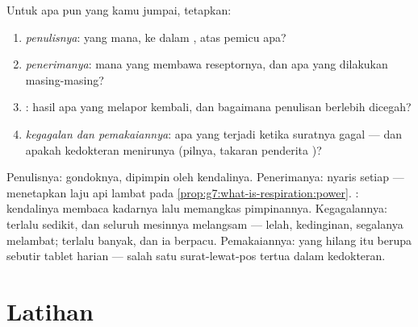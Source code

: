 \begin{method}\label{met:g8:hormonal-communication:read}
Untuk  apa pun yang kamu jumpai, tetapkan:
\begin{enumerate}
  \item \emph{penulisnya}:  yang mana, ke dalam
        , atas pemicu apa?
  \item \emph{penerimanya}:  mana yang membawa
        reseptornya, dan apa yang dilakukan masing-masing?
  \item \emph{}: hasil apa yang melapor
        kembali, dan bagaimana penulisan berlebih dicegah?
  \item \emph{kegagalan dan pemakaiannya}: apa yang terjadi
        ketika suratnya gagal --- dan apakah kedokteran
        menirunya (pilnya, takaran penderita )?
\end{enumerate}
\end{method}

\begin{example}\label{ex:g8:hormonal-communication:thyroid}
Penulisnya:  gondoknya, dipimpin oleh 
kendalinya. Penerimanya: nyaris setiap  --- 
menetapkan laju api lambat pada
\cref{prop:g7:what-is-respiration:power}. :
 kendalinya membaca kadarnya lalu memangkas
pimpinannya. Kegagalannya: terlalu sedikit, dan seluruh
mesinnya melangsam --- lelah, kedinginan, segalanya
melambat; terlalu banyak, dan ia berpacu. Pemakaiannya:
 yang hilang itu berupa sebutir tablet harian ---
salah satu surat-lewat-pos tertua dalam kedokteran.
\end{example}

\section{Latihan}

